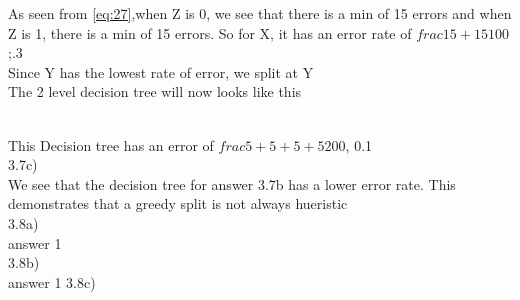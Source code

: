\documentclass[12pt,english]{article}
\begin{document}
As seen from \eqref{eq:27},when Z is 0, we see that there is a min of 15 errors and when Z is 1, there is a min of 15 errors. So for X, it has an error rate of $frac{15+15}{100}$;.3\\
Since Y has the lowest rate of error, we split at Y\\
The 2 level decision tree will now looks like this\\
\\
This Decision tree has an error of $frac{5+5+5+5}{200}$, 0.1\\
3.7c)\\
We see that the decision tree for answer 3.7b has a lower error rate. This demonstrates that a greedy split is not always hueristic\\
3.8a)\\
answer 1\\
3.8b)\\
answer 1
3.8c)\\
\end{document}
